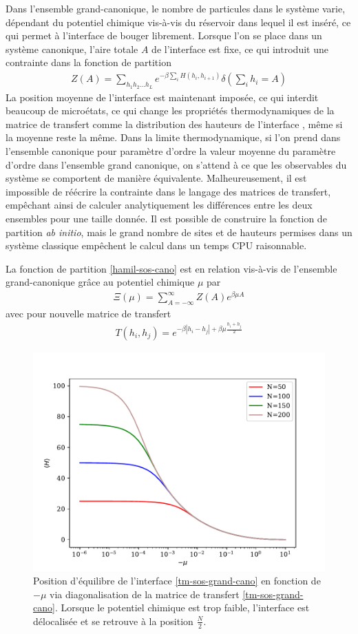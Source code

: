 Dans l'ensemble grand-canonique, le nombre de particules dans le système varie, dépendant du potentiel chimique vis-à-vis du réservoir dans lequel il est inséré, ce qui permet à l'interface de bouger librement. Lorsque l'on se place dans un système canonique, l'aire totale $A$ de l'interface est fixe, ce qui introduit une contrainte dans la fonction de partition
\begin{align}
	 Z(A) = \sum_{h_1 h_2 ... h_L} e^{- \beta \sum_{i} H(h_i,h_{i+1})}  \delta(\sum_i h_i = A)
	 \label{hamil-sos-cano}
\end{align}
La position moyenne de l'interface est maintenant imposée, ce qui interdit beaucoup de microétats, ce qui change  les propriétés thermodynamiques de la matrice de transfert comme la distribution des hauteurs de l'interface \cite{siegert_scaling_1993}, même si la moyenne reste la même. Dans la limite thermodynamique, si l'on prend dans l'ensemble canonique pour paramètre d'ordre la valeur moyenne du paramètre d'ordre dans l'ensemble grand canonique, on s'attend à ce que les observables du système se comportent de manière équivalente. 
Malheureusement, il est impossible de réécrire la contrainte dans le langage des matrices de transfert, empêchant ainsi de calculer analytiquement les différences entre les deux ensembles pour une taille donnée. Il est possible de construire la fonction de partition \textit{ab initio}, mais le grand nombre de sites et de hauteurs permises dans un système classique empêchent le calcul dans un temps CPU raisonnable. 

La fonction de partition \ref{hamil-sos-cano} est en relation vis-à-vis de l'ensemble grand-canonique grâce  au potentiel chimique $\mu$ par
\begin{align}
	 \Xi(\mu) = \sum_{A = -\infty}^\infty Z(A) e^{\beta \mu A}
\end{align}
avec pour nouvelle matrice de transfert
\begin{align}
    T(h_i,h_j) = e^{-\beta |h_i-h_j| + \beta \mu \frac{h_i+h_j}{2}}
    \label{tm-sos-grand-cano}
\end{align}

\begin{figure}
    \centering
	\includegraphics[width=0.5\linewidth]{isingtosos/hauteur-tm-sos.pdf}
	\caption{Position d'équilibre de l'interface \ref{tm-sos-grand-cano} en fonction de $- \mu$ via diagonalisation de la matrice de transfert \ref{tm-sos-grand-cano}. Lorsque le potentiel chimique est trop faible, l'interface est délocalisée et se retrouve à la position $\frac{N}{2}$. }
	\label{hauteur-mu}
\end{figure}

